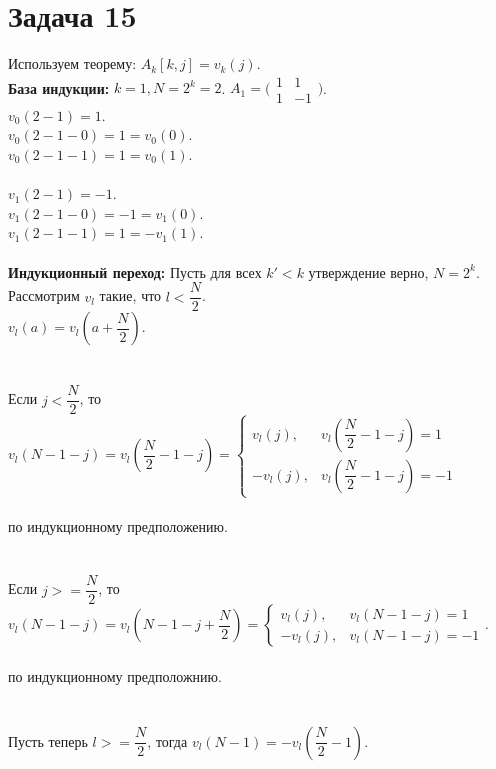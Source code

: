 \documentclass{article}
\begin{document}
{	\section*{Задача 15}
	Используем теорему: $A_k[k, j] = v_k(j)$.\\
	\textbf{База индукции:} $k = 1, N = 2^k = 2$.
	$A_1 = \bigl(\begin{smallmatrix}
		1 & 1\\
		1 & -1
	\end{smallmatrix}\bigr)
	$.\\
	$v_0(2 - 1) = 1$.\\
	$v_0(2 - 1 - 0) = 1 = v_0(0)$.\\
	$v_0(2 - 1 - 1) = 1 = v_0(1)$.\\ \\
	$v_1(2 - 1) = -1$.\\
	$v_1(2 - 1 - 0) = -1 = v_1(0)$.\\
	$v_1(2 - 1 - 1) = 1 = -v_1(1)$.\\ \\
	\textbf{Индукционный переход:} Пусть для всех $k' < k$ утверждение верно, $N = 2^k$.\\
	Рассмотрим $v_l$ такие, что $l < \dfrac{N}{2}$.\\
	$v_l(a) = v_l(a + \dfrac{N}{2})$.\\ \\ \\
	Если $j < \dfrac{N}{2}$, то $v_l(N - 1 - j) = v_l(\dfrac{N}{2} - 1 - j) = \left\{\begin{matrix}
		v_l(j), & v_l(\dfrac{N}{2} - 1 - j) = 1 \\
		-v_l(j), & v_l(\dfrac{N}{2} - 1 - j) = -1
	\end{matrix}\right.$ \\ \\ по индукционному предположению.\\ \\ \\
	Если $j >= \dfrac{N}{2}$, то $v_l(N - 1 - j) = v_l(N - 1 - j + \dfrac{N}{2}) = \left\{\begin{matrix}
		v_l(j), & v_l(N - 1 - j) = 1 \\
	-v_l(j), & v_l(N - 1 - j) = -1 \end{matrix} \right.$. \\ \\ по индукционному предположнию.\\ \\ \\
	Пусть теперь $l >= \dfrac{N}{2}$, тогда $v_l(N - 1) = -v_l(\dfrac{N}{2} - 1)$.\\
}
\end{document}
